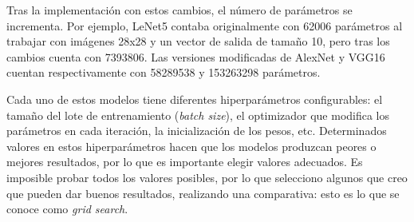 Tras la implementación con estos cambios, el número de parámetros se incrementa. Por ejemplo, LeNet5 contaba originalmente con 62006 parámetros al trabajar con imágenes 28x28 y un vector de salida de tamaño 10, pero tras los cambios cuenta con 7393806. Las versiones modificadas de AlexNet y VGG16 cuentan respectivamente con 58289538 y 153263298 parámetros.

Cada uno de estos modelos tiene diferentes hiperparámetros configurables: el tamaño del lote de entrenamiento (\textit{batch size}), el optimizador que modifica los parámetros en cada iteración, la inicialización de los pesos, etc. Determinados valores en estos hiperparámetros hacen que los modelos produzcan peores o mejores resultados, por lo que es importante elegir valores adecuados. Es imposible probar todos los valores posibles, por lo que selecciono algunos que creo que pueden dar buenos resultados, realizando una comparativa: esto es lo que se conoce como \textit{grid search}.

